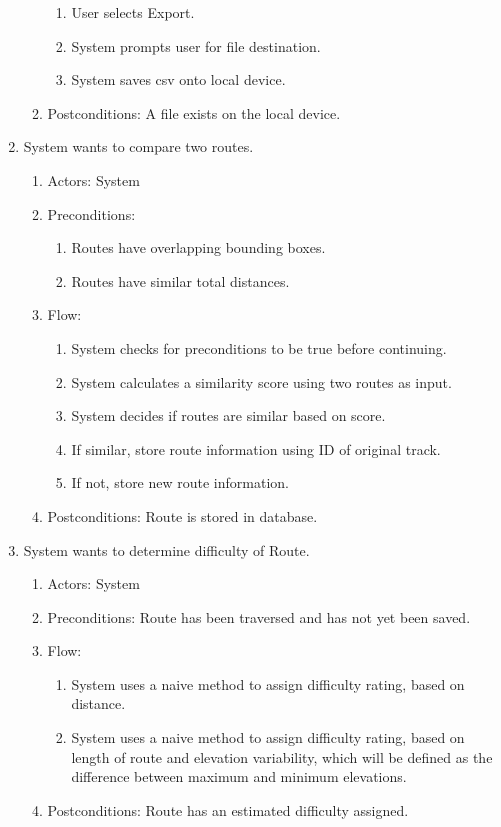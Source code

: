 ﻿\documentclass{article}
\begin{document}
\begin{enumerate}
\begin{enumerate}
            \begin{enumerate}
            \item User selects Export.
            \item System prompts user for file destination.
            \item System saves csv onto local device.
            \end{enumerate}
        \item Postconditions: A file exists on the local device.
    \end{enumerate}
\item System wants to compare two routes.
    \begin{enumerate}
        \item Actors: System
        \item Preconditions:
            \begin{enumerate}
            \item Routes have overlapping bounding boxes.
            \item Routes have similar total distances.
            \end{enumerate}
        \item Flow:
            \begin{enumerate}
            \item System checks for preconditions to be true before continuing.
            \item System calculates a similarity score using two routes as input.
            \item System decides if routes are similar based on score.
            \item If similar, store route information using ID of original track.
            \item If not, store new route information.
            \end{enumerate}
        \item Postconditions: Route is stored in database.
    \end{enumerate}
\item System wants to determine difficulty of Route.
    \begin{enumerate}
        \item Actors: System
        \item Preconditions: Route has been traversed and has not yet been saved.
        \item Flow:
            \begin{enumerate}
            \item System uses a naive method to assign difficulty rating, based on distance.
            \item System uses a naive method to assign difficulty rating, based on length of route and elevation variability, which will be defined as the difference between maximum and minimum elevations.
            \end{enumerate}
        \item Postconditions: Route has an estimated difficulty assigned.
    \end{enumerate}
\end{enumerate}
\end{document}
